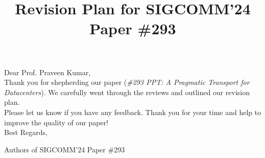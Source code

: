 \documentclass[12pt,one-column]{article}
\begin{document}
\title{Revision Plan for SIGCOMM'24 Paper \#293}
\date{}
\maketitle

\noindent Dear Prof. Praveen Kumar,\\

\noindent Thank you for shepherding our paper (\textit{\#293 PPT: A Pragmatic Transport for Datacenters}). 
We carefully went through the reviews and outlined our revision plan.\\




\noindent Please let us know if you have any feedback. Thank you for your time and help to improve the quality of our paper! \\

\noindent Best Regards,

\noindent Authors of SIGCOMM'24 Paper \#293
\end{document}
